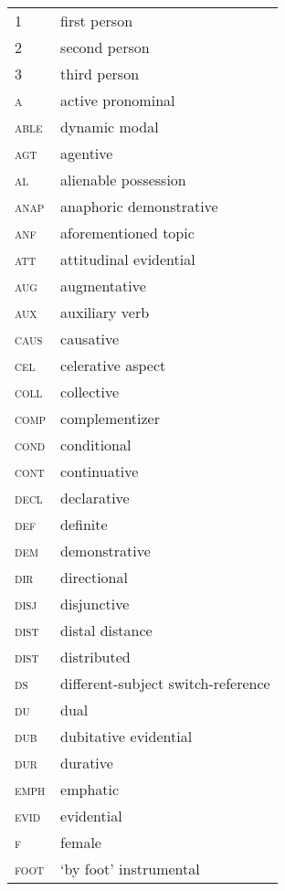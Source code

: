 \addchap{\lsAbbreviationsTitle}

\begin{tabularx}{.45\textwidth}{lQ}
1 & first person \\ 
        2 & second person \\ 
        3 & third person \\ 
        \textsc{a} & active pronominal \\ 
        \textsc{able} & dynamic modal \\ 
        \textsc{agt} & agentive \\ 
        \textsc{al} & alienable possession \\ 
        \textsc{anap} & anaphoric demonstrative \\ 
        \textsc{anf} & aforementioned topic \\ 
        \textsc{att} & attitudinal evidential \\ 
        \textsc{aug} & augmentative \\ 
        \textsc{aux} & auxiliary verb \\ 
        \textsc{caus} & causative \\ 
        \textsc{cel} & celerative aspect \\ 
        \textsc{coll} & collective \\ 
        \textsc{comp} & complementizer \\ 
        \textsc{cond} & conditional \\ 
        \textsc{cont} & continuative \\ 
        \textsc{decl} & declarative \\ 
        \textsc{def} & definite \\ 
        \textsc{dem} & demonstrative \\ 
        \textsc{dir} & directional \\ 
        \textsc{disj} & disjunctive\\
        \textsc{dist} & distal distance \\ 
        \textsc{dist} & distributed \\ 
        \textsc{ds} & different-subject switch-reference \\ 
        \textsc{du} & dual \\ 
        \textsc{dub} & dubitative evidential \\ 
        \textsc{dur} & durative\\
        \textsc{emph} & emphatic \\ 
        \textsc{evid} & evidential \\ 
        \textsc{f} & female \\ 
        \textsc{foot} & `by foot' instrumental \\ 
\end{tabularx}
